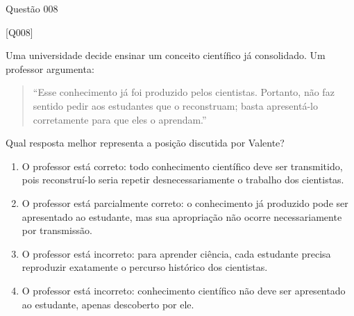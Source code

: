 \documentclass[xcolor=dvipsnames,table]{beamer}
\begin{document}
 \begin{frame}{Questão 008}

	\footnotesize

    \begin{block}{[Q008]}
    
    Uma universidade decide ensinar um conceito científico já consolidado. Um professor argumenta:

    \begin{quote}
    ``Esse conhecimento já foi produzido pelos cientistas. Portanto, não faz sentido pedir aos estudantes que o reconstruam; basta apresentá-lo corretamente para que eles o aprendam.''
    \end{quote}

    Qual resposta melhor representa a posição discutida por Valente?

    \end{block}

    \begin{enumerate}[label=(\Alph*)]

        \item O professor está correto: todo conhecimento científico deve ser transmitido, pois reconstruí-lo seria repetir desnecessariamente o trabalho dos cientistas.

        \item O professor está parcialmente correto: o conhecimento já produzido pode ser apresentado ao estudante, mas sua apropriação não ocorre necessariamente por transmissão.

        \item O professor está incorreto: para aprender ciência, cada estudante precisa reproduzir exatamente o percurso histórico dos cientistas.

        \item O professor está incorreto: conhecimento científico não deve ser apresentado ao estudante, apenas descoberto por ele.

    \end{enumerate}

\end{frame}
\end{document}
